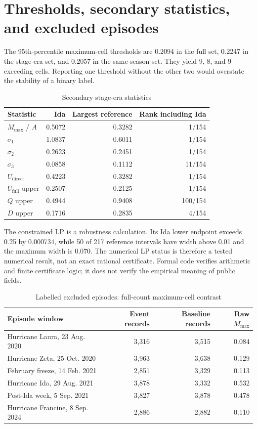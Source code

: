 \documentclass[11pt]{article}
\begin{document}
\section{Thresholds, secondary statistics, and excluded episodes}

The 95th-percentile maximum-cell thresholds are 0.2094 in the full set, 0.2247 in the stage-era set, and 0.2057 in the same-season set. They yield 9, 8, and 9 exceeding cells. Reporting one threshold without the other two would overstate the stability of a binary label.

\begin{table}[t]
\centering
\caption{Secondary stage-era statistics}
\label{tab:secondarysupp}
\begin{tabular}{@{}lrrr@{}}
\toprule
Statistic & Ida & Largest reference & Rank including Ida \\
\midrule
$M_{\max}$ / $A$ & 0.5072 & 0.3282 & 1/154 \\
$\sigma_1$ & 1.0837 & 0.6011 & 1/154 \\
$\sigma_2$ & 0.2623 & 0.2451 & 1/154 \\
$\sigma_3$ & 0.0858 & 0.1112 & 11/154 \\
$U_{\mathrm{direct}}$ & 0.4223 & 0.3282 & 1/154 \\
$U_{\mathrm{full}}$ upper & 0.2507 & 0.2125 & 1/154 \\
$Q$ upper & 0.4944 & 0.9408 & 100/154 \\
$D$ upper & 0.1716 & 0.2835 & 4/154 \\
\bottomrule
\end{tabular}
\end{table}

The constrained LP is a robustness calculation. Its Ida lower endpoint exceeds 0.25 by 0.000734, while 50 of 217 reference intervals have width above 0.01 and the maximum width is 0.070. The numerical LP status is therefore a tested numerical result, not an exact rational certificate. Formal code verifies arithmetic and finite certificate logic; it does not verify the empirical meaning of public fields.

\begin{table}[t]
\centering
\caption{Labelled excluded episodes: full-count maximum-cell contrast}
\label{tab:episodes}
\begin{tabular}{@{}lrrr@{}}
\toprule
Episode window & Event records & Baseline records & Raw $M_{\max}$ \\
\midrule
Hurricane Laura, 23 Aug. 2020 & 3,316 & 3,515 & 0.084 \\
Hurricane Zeta, 25 Oct. 2020 & 3,963 & 3,638 & 0.129 \\
February freeze, 14 Feb. 2021 & 2,851 & 3,329 & 0.113 \\
Hurricane Ida, 29 Aug. 2021 & 3,878 & 3,332 & 0.532 \\
Post-Ida week, 5 Sep. 2021 & 3,827 & 3,878 & 0.478 \\
Hurricane Francine, 8 Sep. 2024 & 2,886 & 2,882 & 0.110 \\
\bottomrule
\end{tabular}
\end{table}
\end{document}

